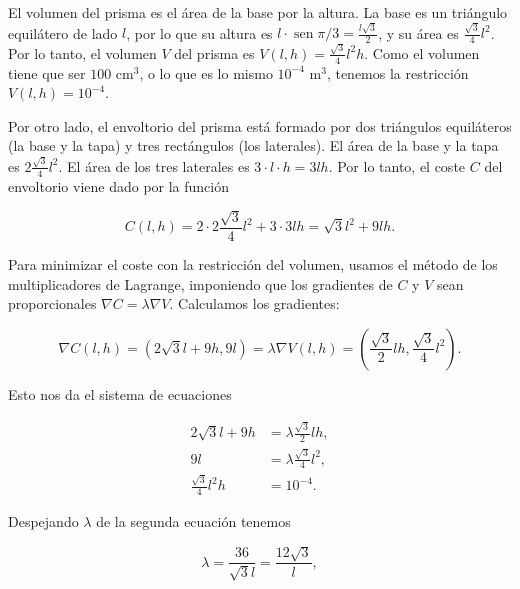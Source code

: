 \documentclass[
  spanish,
  a4paper,
]{scrreport}
\theoremstyle{definition}
\theoremstyle{remark}
\begin{document}
\begin{tcolorbox}[enhanced jigsaw, arc=.35mm, bottomrule=.15mm, bottomtitle=1mm, breakable, colback=white, colbacktitle=quarto-callout-tip-color!10!white, colframe=quarto-callout-tip-color-frame, coltitle=black, left=2mm, leftrule=.75mm, opacityback=0, opacitybacktitle=0.6, rightrule=.15mm, title=\textcolor{quarto-callout-tip-color}{\faLightbulb}\hspace{0.5em}{Solución}, titlerule=0mm, toprule=.15mm, toptitle=1mm]

El volumen del prisma es el área de la base por la altura. La base es un
triángulo equilátero de lado \(l\), por lo que su altura es
\(l\cdot \operatorname{sen}{\pi/3} = \frac{l\sqrt{3}}{2}\), y su área es
\(\frac{\sqrt{3}}{4}l^2\). Por lo tanto, el volumen \(V\) del prisma es
\(V(l, h) = \frac{\sqrt{3}}{4}l^2 h\). Como el volumen tiene que ser
\(100\) cm\(^3\), o lo que es lo mismo \(10^{-4}\) m\(^3\), tenemos la
restricción \(V(l, h) = 10^{-4}\).

Por otro lado, el envoltorio del prisma está formado por dos triángulos
equiláteros (la base y la tapa) y tres rectángulos (los laterales). El
área de la base y la tapa es \(2 \frac{\sqrt{3}}{4}l^2\). El área de los
tres laterales es \(3 \cdot l \cdot h = 3lh\). Por lo tanto, el coste
\(C\) del envoltorio viene dado por la función

\[
C(l, h) = 2 \cdot 2 \frac{\sqrt{3}}{4}l^2 + 3 \cdot 3lh = \sqrt{3}l^2 + 9lh.
\]

Para minimizar el coste con la restricción del volumen, usamos el método
de los multiplicadores de Lagrange, imponiendo que los gradientes de
\(C\) y \(V\) sean proporcionales \(\nabla C = \lambda \nabla V\).
Calculamos los gradientes:

\[
\nabla C(l,h) = \left(2\sqrt{3}l + 9h, 9l\right) = \lambda \nabla V(l,h) =\left(\frac{\sqrt{3}}{2}l h, \frac{\sqrt{3}}{4}l^2\right).
\]

Esto nos da el sistema de ecuaciones

\begin{align*}
2\sqrt{3}l + 9h &= \lambda \frac{\sqrt{3}}{2}l h, \\
9l &= \lambda \frac{\sqrt{3}}{4}l^2, \\
\frac{\sqrt{3}}{4}l^2 h &= 10^{-4}.
\end{align*}

Despejando \(\lambda\) de la segunda ecuación tenemos

\[
\lambda = \frac{36}{\sqrt{3}l} = \frac{12\sqrt{3}}{l},
\]


\end{tcolorbox}
\end{document}
